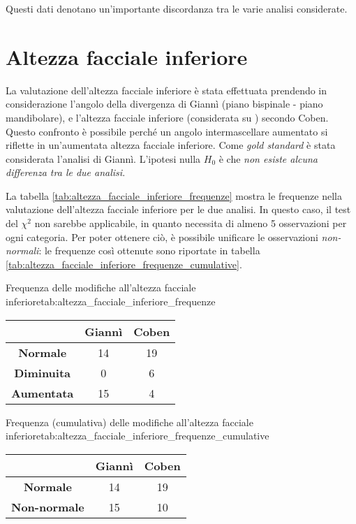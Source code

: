Questi dati denotano un'importante discordanza tra le varie analisi considerate.

\section{Altezza facciale inferiore}
La valutazione dell'altezza facciale inferiore è stata effettuata prendendo in considerazione l'angolo della divergenza di Giannì (piano bispinale - piano mandibolare), e l'altezza facciale inferiore  (considerata su ) secondo Coben. Questo confronto è possibile perché un angolo intermascellare aumentato si riflette in un'aumentata altezza facciale inferiore. Come \emph{gold standard} è stata considerata l'analisi di Giannì. L'ipotesi nulla $H_0$ è che \emph{non esiste alcuna differenza tra le due analisi}.

La tabella \vref{tab:altezza_facciale_inferiore_frequenze} mostra le frequenze nella valutazione dell'altezza facciale inferiore per le due analisi. In questo caso, il test del $\chi^2$ non sarebbe applicabile, in quanto necessita di almeno 5 osservazioni per ogni categoria. Per poter ottenere ciò, è possibile unificare le osservazioni \emph{non-normali}: le frequenze così ottenute sono riportate in tabella \vref{tab:altezza_facciale_inferiore_frequenze_cumulative}.

\begin{table}
\centering
\begin{centeredcaptionlabel}{Frequenza delle modifiche all'altezza facciale inferiore}{tab:altezza_facciale_inferiore_frequenze}
\begin{tabular}{>{\bfseries}ccc}
\toprule
& \textbf{Giannì} & \textbf{Coben} \\
\midrule
Normale & 14 & 19 \\
Diminuita & 0 & 6 \\
Aumentata & 15 & 4 \\
\bottomrule
\end{tabular}
\end{centeredcaptionlabel}\hfill
\begin{centeredcaptionlabel}{Frequenza (cumulativa) delle modifiche all'altezza facciale inferiore}{tab:altezza_facciale_inferiore_frequenze_cumulative}
\begin{tabular}{>{\bfseries}ccc}
\toprule
& \textbf{Giannì} & \textbf{Coben} \\
\midrule
Normale & 14 & 19 \\
Non-normale & 15 & 10 \\
\bottomrule
\end{tabular}
\end{centeredcaptionlabel}
\end{table}

